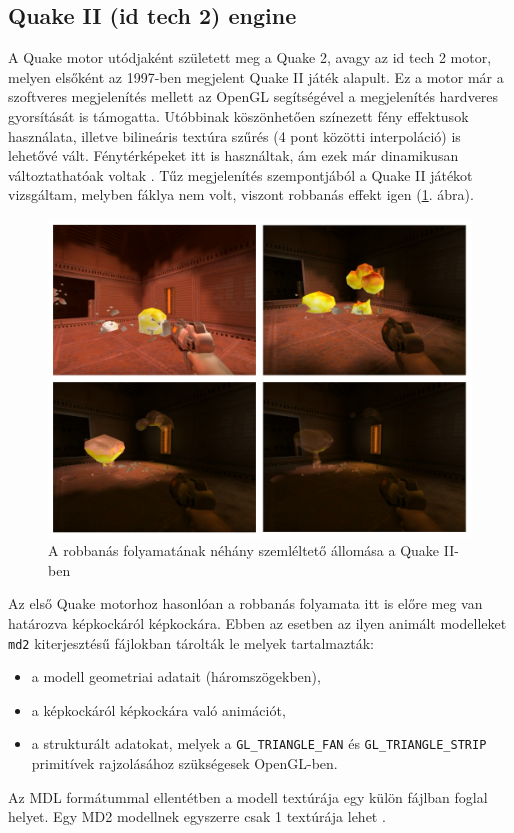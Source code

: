 \subsection{Quake II (id tech 2) engine}


A Quake motor utódjaként született meg a Quake 2, avagy az id tech 2 motor, melyen elsőként az 1997-ben megjelent Quake II játék alapult. Ez a motor már a szoftveres megjelenítés mellett az OpenGL segítségével a megjelenítés hardveres gyorsítását is támogatta. Utóbbinak köszönhetően színezett fény effektusok használata, illetve bilineáris textúra szűrés (4 pont közötti interpoláció) is lehetővé vált. Fénytérképeket itt is használtak, ám ezek már dinamikusan változtathatóak voltak \cite{wikiQuake2, fsQuake2}. Tűz megjelenítés szempontjából a Quake II játékot vizsgáltam, melyben fáklya nem volt, viszont robbanás effekt igen (\ref{fig:quake2explosion}. ábra).

\begin{figure}[h]
\centering
\includegraphics[width=\textwidth]{kepek/quake2explosion9.png}
\caption{A robbanás folyamatának néhány szemléltető állomása a Quake II-ben}
\label{fig:quake2explosion}
\end{figure}

Az első Quake motorhoz hasonlóan a robbanás folyamata itt is előre meg van határozva képkockáról képkockára. Ebben az esetben az ilyen animált modelleket \texttt{md2} kiterjesztésű fájlokban tárolták le melyek tartalmazták:
\begin{itemize} 
\item a modell geometriai adatait (háromszögekben),
\item a képkockáról képkockára való animációt,
\item a strukturált adatokat, melyek a \texttt{GL\_TRIANGLE\_FAN} és \texttt{GL\_TRIANGLE\_STRIP} primitívek rajzolásához szükségesek OpenGL-ben.
\end{itemize} 
Az MDL formátummal ellentétben a modell textúrája egy külön fájlban foglal helyet. Egy MD2 modellnek egyszerre csak 1 textúrája lehet \cite{MD2format}.

